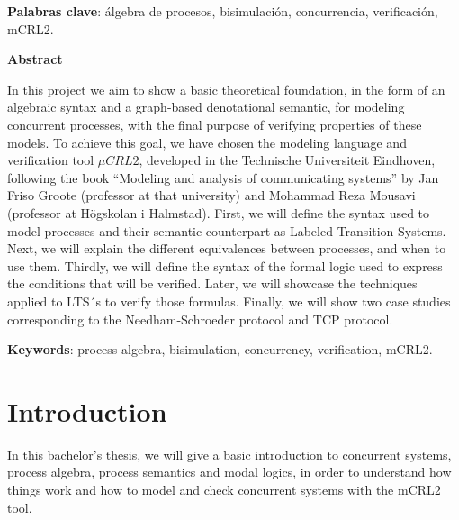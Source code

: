 \documentclass[11pt]{article}
\theoremstyle{definition}
\theoremstyle{plain}
\begin{document}
\textbf{Palabras clave}: álgebra de procesos, bisimulación, concurrencia, verificación, mCRL2.

\begin{center}
\textbf{Abstract}
\end{center}

In this project we aim to show a basic theoretical foundation, in the form of an algebraic syntax and a graph-based denotational semantic, for modeling concurrent processes, with the final purpose of verifying properties of these models. To achieve this goal, we have chosen the modeling language and verification tool $\mu CRL2$, developed in the Technische Universiteit Eindhoven, following the book ``Modeling and analysis of communicating systems'' by Jan Friso Groote (professor at that university) and Mohammad Reza Mousavi (professor at Högskolan i Halmstad). First, we will define the syntax used to model processes and their semantic counterpart as Labeled Transition Systems. Next, we will explain the different  equivalences between processes, and when to use them. Thirdly, we will define the syntax of the formal logic used to express the conditions that will be verified. Later, we will showcase the techniques applied to LTS´s to verify those formulas. Finally, we will show two case studies corresponding to the Needham-Schroeder protocol and TCP protocol.

\textbf{Keywords}: process algebra, bisimulation, concurrency, verification, mCRL2.
\clearpage
\tableofcontents

\clearpage


\section{Introduction}
In this bachelor's thesis, we will give a basic introduction to concurrent systems, process algebra, process semantics and modal logics, in order to understand how things work and how to model and check concurrent systems with the mCRL2 tool.
\end{document}
